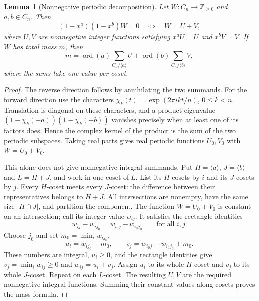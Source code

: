 \documentclass[11pt]{article}
\newtheorem{lemma}[theorem]{Lemma}
\theoremstyle{remark}
\newcommand{\Z}{\mathbb Z}
\newcommand{\ord}{\operatorname{ord}}
\begin{document}
\begin{lemma}[Nonnegative periodic decomposition]\label{lem:periodic}
Let $W\colon C_n\to\Z_{\ge0}$ and $a,b\in C_n$. Then
\[
 (1-x^a)(1-x^b)W=0
 \quad\Longleftrightarrow\quad
 W=U+V,
\]
where $U,V$ are nonnegative integer functions satisfying
$x^aU=U$ and $x^bV=V$. If $W$ has total mass $m$, then
\[
 m=\ord(a)\sum_{C_n/\langle a\rangle}U
   +\ord(b)\sum_{C_n/\langle b\rangle}V,
\]
where the sums take one value per coset.
\end{lemma}
\begin{proof}
The reverse direction follows by annihilating the two summands. For the
forward direction use the characters $\chi_k(t)=\exp(2\pi i kt/n)$,
$0\le k<n$. Translation is diagonal on these characters, and a product
eigenvalue $(1-\chi_k(-a))(1-\chi_k(-b))$ vanishes precisely when at least
one of its factors does. Hence the complex kernel of the product is the
sum of the two periodic subspaces. Taking real parts gives real periodic
functions $U_0,V_0$ with $W=U_0+V_0$.

This alone does not give nonnegative integral summands. Put
$H=\langle a\rangle$, $J=\langle b\rangle$ and $L=H+J$, and work
in one coset of $L$. List its $H$-cosets by $i$ and its $J$-cosets by $j$.
Every $H$-coset meets every $J$-coset: the difference between their
representatives belongs to $H+J$. All intersections are nonempty, have
the same size $|H\cap J|$, and partition the component. The function
$W=U_0+V_0$ is constant on an intersection; call its integer value $w_{ij}$.
It satisfies the rectangle identities
\[
 w_{ij}-w_{ij_0}=w_{i_0j}-w_{i_0j_0}
 \qquad\text{for all }i,j.
\]
Choose $j_0$ and set $m_0=\min_i w_{ij_0}$,
\[
 u_i=w_{ij_0}-m_0,\qquad
 v_j=w_{i_0j}-w_{i_0j_0}+m_0.
\]
These numbers are integral, $u_i\ge0$, and the rectangle identities give
$v_j=\min_i w_{ij}\ge0$ and $w_{ij}=u_i+v_j$. Assign $u_i$ to its whole
$H$-coset and $v_j$ to its whole $J$-coset. Repeat on each $L$-coset.
The resulting $U,V$ are the required nonnegative integral functions.
Summing their constant values along cosets proves the mass formula.
\end{proof}
\end{document}
